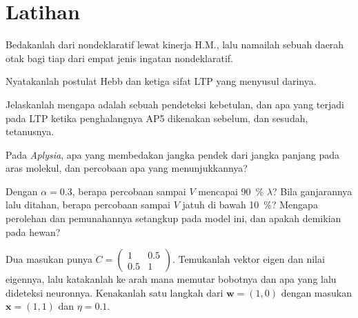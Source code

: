 \section{Latihan}

\begin{exercise}[$\star$]\label{exo:b3:learning-memory:1}
Bedakanlah  dari nondeklaratif lewat kinerja H.M.,
lalu namailah sebuah daerah otak bagi tiap dari empat jenis
ingatan nondeklaratif.
\end{exercise}

\begin{exercise}[$\star$]\label{exo:b3:learning-memory:2}
Nyatakanlah postulat Hebb dan ketiga sifat LTP yang menyusul
darinya.
\end{exercise}

\begin{exercise}[$\star$]\label{exo:b3:learning-memory:3}
Jelaskanlah mengapa  adalah sebuah pendeteksi kebetulan, dan apa
yang terjadi pada LTP ketika penghalangnya AP5 dikenakan sebelum, dan sesudah,
tetanusnya.
\end{exercise}

\begin{exercise}[$\star$]\label{exo:b3:learning-memory:4}
Pada \emph{Aplysia}, apa yang membedakan  jangka pendek dari jangka
panjang pada aras molekul, dan percobaan apa yang menunjukkannya?
\end{exercise}

\begin{exercise}[$\star\star$]\label{exo:b3:learning-memory:5}
Dengan $\alpha = 0.3$, berapa percobaan sampai $V$ mencapai \qty{90}{\%}
$\lambda$? Bila ganjarannya lalu ditahan, berapa percobaan sampai $V$
jatuh di bawah \qty{10}{\%}? Mengapa perolehan dan pemunahannya setangkup
pada model ini, dan apakah demikian pada hewan?
\end{exercise}

\begin{exercise}[$\star\star$]\label{exo:b3:learning-memory:6}
Dua masukan punya $C = \begin{pmatrix}1 & 0.5\\ 0.5 & 1\end{pmatrix}$.
Temukanlah vektor eigen dan nilai eigennya, lalu katakanlah ke arah mana
 memutar bobotnya dan apa yang lalu dideteksi neuronnya. Kenakanlah
 satu langkah dari $\mathbf{w} = (1,0)$ dengan masukan $\mathbf{x}
= (1,1)$ dan $\eta = 0.1$.
\end{exercise}


